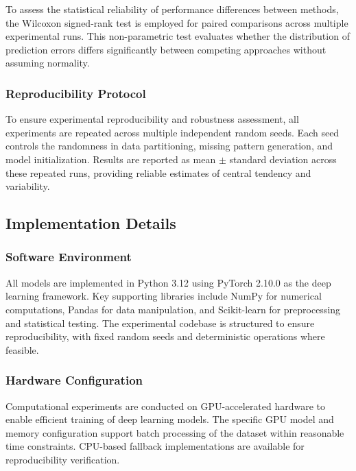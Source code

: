 \documentclass[5p,times]{elsarticle}
\begin{document}
To assess the statistical reliability of performance differences between methods, the Wilcoxon signed-rank test is employed for paired comparisons across multiple experimental runs. This non-parametric test evaluates whether the distribution of prediction errors differs significantly between competing approaches without assuming normality.

\subsubsection{Reproducibility Protocol}

To ensure experimental reproducibility and robustness assessment, all experiments are repeated across multiple independent random seeds. Each seed controls the randomness in data partitioning, missing pattern generation, and model initialization. Results are reported as mean $\pm$ standard deviation across these repeated runs, providing reliable estimates of central tendency and variability.

\subsection{Implementation Details}\label{sec:implementation}

\subsubsection{Software Environment}

All models are implemented in Python 3.12 using PyTorch 2.10.0 as the deep learning framework. Key supporting libraries include NumPy for numerical computations, Pandas for data manipulation, and Scikit-learn for preprocessing and statistical testing. The experimental codebase is structured to ensure reproducibility, with fixed random seeds and deterministic operations where feasible.

\subsubsection{Hardware Configuration}

Computational experiments are conducted on GPU-accelerated hardware to enable efficient training of deep learning models. The specific GPU model and memory configuration support batch processing of the dataset within reasonable time constraints. CPU-based fallback implementations are available for reproducibility verification.
\end{document}
